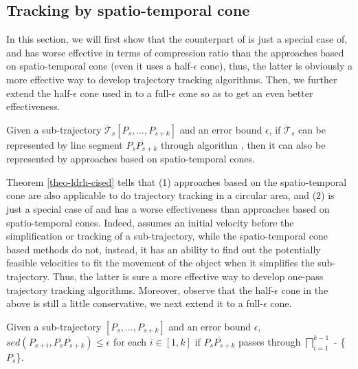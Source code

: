 \subsection{Tracking by spatio-temporal cone}

In this section, we will first show that the counterpart of \ldrh is just a special case of, and has worse effective in terms of compression ratio than the approaches based on spatio-temporal cone (even it uses a half-$\epsilon$ cone), thus, the latter is obviously a more effective way to develop trajectory tracking algorithms. Then, we further extend the half-$\epsilon$ cone used in \cised to a full-$\epsilon$ cone so as to get an even better effectiveness.



\begin{theorem}
\label{theo-ldrh-cised}
Given a sub-trajectory $\dddot{\mathcal{T}}_s[P_s,...,P_{s+k}]$ and an error bound $\epsilon$, if $\dddot{\mathcal{T}}_s$ can be represented by line segment $\overline{P_sP_{s+k}}$ through algorithm \ldrh, then it can also be represented by approaches based on spatio-temporal cones.
\end{theorem}

Theorem \ref{theo-ldrh-cised} tells that (1) {approaches based on the spatio-temporal cone are also applicable to do trajectory tracking in a circular area}, and (2) \ldrh is just a special case of and has a worse effectiveness than approaches based on spatio-temporal cones. Indeed, \ldrh assumes an initial velocity before the simplification or tracking of a sub-trajectory, while the spatio-temporal cone based methods do not, instead, it has an ability to find out the potentially feasible velocities to fit the movement of the object when it simplifies the sub-trajectory. Thus, the latter is sure a more effective way to develop one-pass trajectory tracking algorithms. 
%
Moreover, observe that the half-$\epsilon$ cone in the above is still a little conservative, we next extend it to a full-$\epsilon$ cone.%


\begin{theorem}
	\label{theo-full-cone}
	Given a sub-trajectory $[P_s,...,P_{s+k}]$ and an error bound $\epsilon$, $sed(P_{s+i}, \overline{P_sP_{s+k}})\le \epsilon$ for each $i \in [1,k]$ if $\overline{P_sP_{s+k}}$ passes through $\bigsqcap_{i=1}^{k-1}$ - \{$P_s$\}.
\end{theorem}

